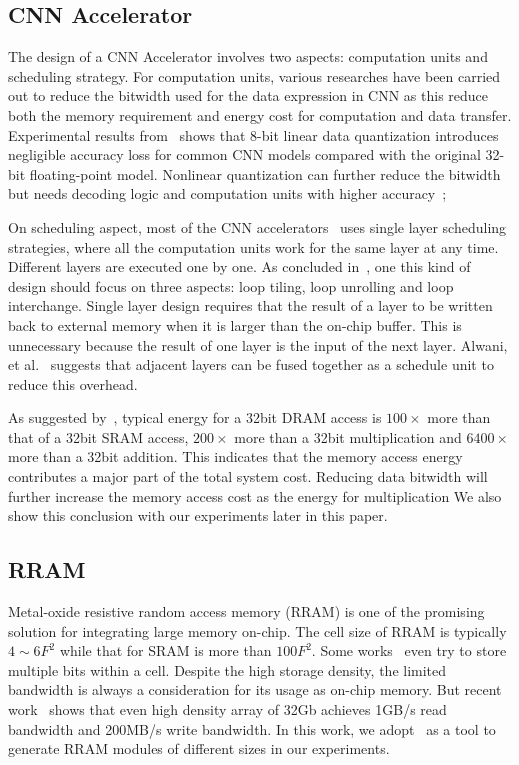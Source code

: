 \subsection{CNN Accelerator}
The design of a CNN Accelerator involves two aspects: computation units and scheduling strategy. For computation units, various researches have been carried out to reduce the bitwidth used for the data expression in CNN as this reduce both the memory requirement and energy cost for computation and data transfer. Experimental results from~\cite{guo2017software} shows that 8-bit linear data quantization introduces negligible accuracy loss for common CNN models compared with the original 32-bit floating-point model. Nonlinear quantization can further reduce the bitwidth~\cite{han2015deep} but needs decoding logic and computation units with higher accuracy~\cite{eie};

On scheduling aspect, most of the CNN accelerators~\cite{zhang2015optimizing}\cite{qiu2016going}\cite{ma2017optimizing} uses single layer scheduling strategies, where all the computation units work for the same layer at any time. Different layers are executed one by one. As concluded in~\cite{ma2017optimizing}, one this kind of design should focus on three aspects: loop tiling, loop unrolling and loop interchange. Single layer design requires that the result of a layer to be written back to external memory when it is larger than the on-chip buffer. This is unnecessary because the result of one layer is the input of the next layer. Alwani, et al.~\cite{alwani2016fused} suggests that adjacent layers can be fused together as a schedule unit to reduce this overhead.

As suggested by~\cite{mac_energy}, typical energy for a 32bit DRAM access is $100\times$ more than that of a 32bit SRAM access, $200\times$ more than a 32bit multiplication and $6400\times$ more than a 32bit addition. This indicates that the memory access energy contributes a major part of the total system cost. Reducing data bitwidth will further increase the memory access cost as the energy for multiplication We also show this conclusion with our experiments later in this paper.

\subsection{RRAM}
Metal-oxide resistive random access memory (RRAM) is one of the promising solution for integrating large memory on-chip. The cell size of RRAM is typically $4\sim 6F^2$ while that for SRAM is more than $100F^2$. Some works~\cite{chien2009multi}\cite{chien2011multi} even try to store multiple bits within a cell. Despite the high storage density, the limited bandwidth is always a consideration for its usage as on-chip memory. But recent work~\cite{fackenthal201419} shows that even high density array of 32Gb achieves 1GB/s read bandwidth and 200MB/s write bandwidth. In this work, we adopt~\cite{dong2014nvsim} as a tool to generate RRAM modules of different sizes in our experiments.